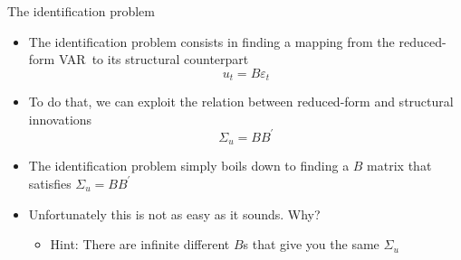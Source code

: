 \documentclass[10pt,handout]{beamer}
\begin{document}
\begin{frame}
{The identification problem}
\begin{itemize}
\item The identification problem consists in finding a mapping from the reduced-form VAR\ to its structural counterpart%
\begin{equation*}
u_{t}= B\varepsilon_{t}
\end{equation*}
\pause
\item To do that, we can exploit the relation between reduced-form and structural innovations%
\begin{equation*}
\Sigma_{u}=BB^{\prime}
\end{equation*}
\item The identification problem simply boils down to finding a $B$ matrix that satisfies $\Sigma_{u}=BB^{\prime}$
\bigskip \pause
\item Unfortunately this is not as easy as it sounds. Why?
\smallskip
\begin{itemize}
\item Hint: There are infinite different $B$s that give you the same $\Sigma_{u}$ \medskip
\end{itemize}
\end{itemize}
\end{frame}
\shownotesblock{}
\end{document}
